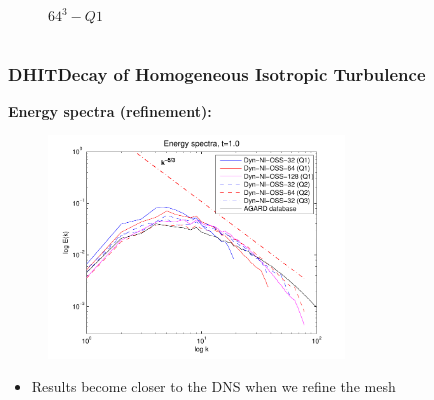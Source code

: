 \begin{frame}
\begin{columns}
\begin{column}{0.5\textwidth}
\begin{figure}
      \vspace*{-0.8cm}
  \caption{$64^3-Q1$}
  \end{figure}
  \end{column}
  \end{columns}
  \begin{overlayarea}{\textwidth}{1.5cm}
  \vspace*{-0.3cm}
  \end{overlayarea}
\end{frame}
\begin{frame}[t]
  \frametitle{DHIT{\small Decay of Homogeneous Isotropic Turbulence}}
  \textbf{Energy spectra (refinement):}
  \begin{figure}
    \centering	
    \includegraphics[width=0.7\textwidth]{Figures/spec_hp_1}
  \end{figure}
  \begin{overlayarea}{\textwidth}{1.5cm}
  \vspace*{-0.6cm}
  \begin{itemize}
  	\item Results become \alert<1->{closer to the DNS when we refine} the mesh
  \end{itemize}
  \end{overlayarea}
\end{frame}